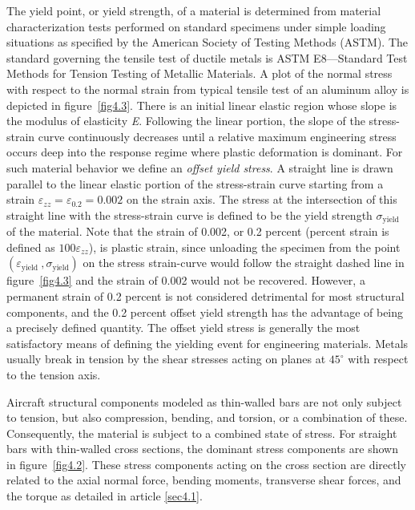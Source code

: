 \documentclass{AeroStructure-ERJohnson}
\begin{document}
The yield point, or yield strength, of a material is determined from material characterization tests performed on standard specimens under simple loading situations as specified by the American Society of Testing Methods (ASTM). The standard governing the tensile test of ductile metals is ASTM E8---Standard Test Methods for Tension Testing of Metallic Materials. A plot of the normal stress with respect to the normal strain from typical tensile test of an aluminum alloy is depicted in figure~\ref{fig4.3}. There is an initial linear elastic region whose slope is the modulus of elasticity \textit{E}. Following the linear portion, the slope of the stress-strain curve continuously decreases until a relative maximum engineering stress occurs deep into the response regime where plastic deformation is dominant. For such material behavior we define an \textit{offset yield stress}. A straight line is drawn parallel to the linear elastic portion of the stress-strain curve starting from a strain $\varepsilon_{z z}=\varepsilon_{0.2}=0.002$ on the strain axis. The stress at the intersection of this straight line with the stress-strain curve is defined to be the yield strength $\sigma_{\textrm{yield }}$ of the material. Note that the strain of 0.002, or 0.2 percent (percent strain is defined as $100 \varepsilon_{z z}$), is plastic strain, since unloading the specimen from the point $\left(\varepsilon_{\textrm{yield }}, \sigma_{\textrm{yield}}\right)$ on the stress strain-curve would follow the straight dashed line in figure~\ref{fig4.3} and the strain of 0.002 would not be recovered. However, a permanent strain of 0.2 percent is not considered detrimental for most structural components, and the 0.2 percent offset yield strength has the advantage of being a precisely defined quantity. The offset yield stress is generally the most satisfactory means of defining the yielding event for engineering materials. Metals usually break in tension by the shear stresses acting on planes at $45^{\circ}$ with respect to the tension axis.

Aircraft structural components modeled as thin-walled bars are not only subject to tension, but also compression, bending, and torsion, or a combination of these. Consequently, the material is subject to a combined state of stress. For straight bars with thin-walled cross sections, the dominant stress components are shown in figure~\ref{fig4.2}. These stress components acting on the cross section are directly related to the axial normal force, bending moments, transverse shear forces, and the torque as detailed in article \ref{sec4.1}.
\end{document}
